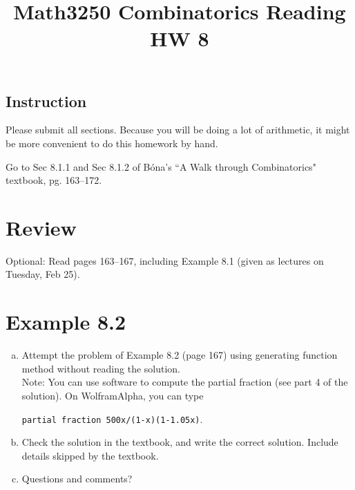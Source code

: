 \documentclass[10pt]{amsart}
\title{Math3250 Combinatorics Reading HW 8}
\begin{document}
\maketitle



\subsection*{Instruction}
Please submit all sections. 
Because you will be doing a lot of arithmetic, it might be more convenient to do this homework by hand.



Go to Sec 8.1.1 and Sec 8.1.2 of B\'ona's ``A Walk through Combinatorics" textbook, pg. 163--172.

\bigskip


\section*{Review}
Optional: Read pages 163--167, including Example 8.1 (given as lectures on Tuesday, Feb 25).


\section{Example 8.2}
\begin{enumerate}[a.]
	\item 
Attempt the problem of Example 8.2 (page 167) using generating function method without reading the solution. \\

Note:
You can use software to compute the partial fraction (see part 4 of the solution). On WolframAlpha, you can type 
\begin{center}
\texttt{partial fraction 500x/(1-x)(1-1.05x)}.
\end{center}

\item 
Check the solution in the textbook, and write the correct solution. Include details skipped by the textbook.

\item Questions and comments?
\end{enumerate}
\end{document}
